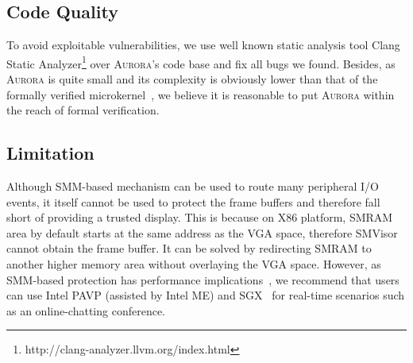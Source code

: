 \subsection{Code Quality}
To avoid exploitable vulnerabilities, we use well known static analysis tool Clang Static Analyzer\footnote{http://clang-analyzer.llvm.org/index.html} over \textsc{Aurora}'s code base and fix all bugs we found. Besides, as \textsc{Aurora} is quite small and its complexity is obviously lower than that of the formally verified microkernel~\cite{DBLP:conf/sosp/KleinEHACDEEKNSTW09}, we believe it is reasonable to put \textsc{Aurora} within the reach of formal verification.

%

\subsection{Limitation}
Although  SMM-based mechanism can be used to route many peripheral I/O events, it itself cannot be used to protect the frame buffers and therefore fall short of providing a trusted display. This is because on X86 platform, SMRAM area by default starts at the same address as the VGA space, therefore SMVisor cannot obtain the frame buffer. It can be solved by redirecting  SMRAM to another higher memory area without overlaying the VGA space. However, as  SMM-based protection has performance implications~\cite{DBLP:conf/iiswc/DelgadoK13}, we recommend that users can use Intel PAVP (assisted by Intel ME) and SGX~\cite{DBLP:conf/isca/HoekstraLPPC13} for real-time scenarios such as an online-chatting conference.


